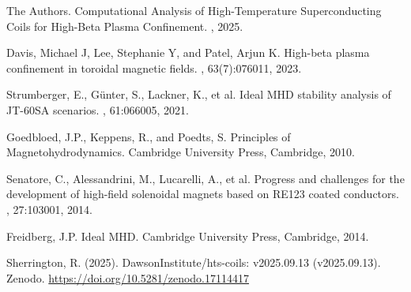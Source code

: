 \documentclass[12pt,a4paper]{article}
\begin{document}
\begin{thebibliography}{99}

The Authors.
\newblock Computational Analysis of High-Temperature Superconducting Coils for High-Beta Plasma Confinement.
, 2025.

Davis, Michael J, Lee, Stephanie Y, and Patel, Arjun K.
\newblock High-beta plasma confinement in toroidal magnetic fields.
, 63(7):076011, 2023.

Strumberger, E., Günter, S., Lackner, K., et al.
\newblock Ideal MHD stability analysis of JT-60SA scenarios.
, 61:066005, 2021.

Goedbloed, J.P., Keppens, R., and Poedts, S.
\newblock Principles of Magnetohydrodynamics.
\newblock Cambridge University Press, Cambridge, 2010.

Senatore, C., Alessandrini, M., Lucarelli, A., et al.
\newblock Progress and challenges for the development of high-field solenoidal magnets based on RE123 coated conductors.
, 27:103001, 2014.

Freidberg, J.P.
\newblock Ideal MHD.
\newblock Cambridge University Press, Cambridge, 2014.

Sherrington, R. (2025). 
\newblock DawsonInstitute/hts-coils: v2025.09.13 (v2025.09.13). 
\newblock Zenodo. \url{https://doi.org/10.5281/zenodo.17114417}


\end{thebibliography}
\end{document}
